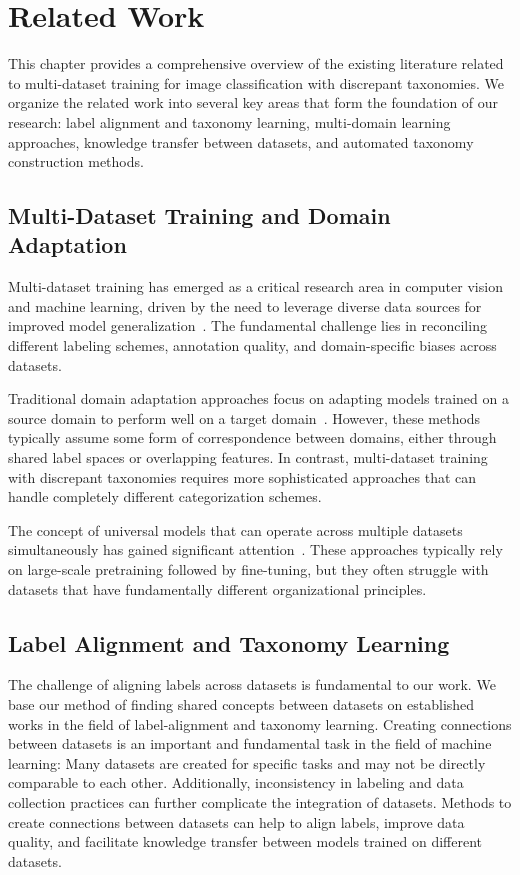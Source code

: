 \chapter{Related Work}

This chapter provides a comprehensive overview of the existing literature related to
multi-dataset training for image classification with discrepant taxonomies. We organize
the related work into several key areas that form the foundation of our research: label
alignment and taxonomy learning, multi-domain learning approaches, knowledge transfer
between datasets, and automated taxonomy construction methods.

\section{Multi-Dataset Training and Domain Adaptation}

Multi-dataset training has emerged as a critical research area in computer vision and
machine learning, driven by the need to leverage diverse data sources for improved model
generalization~\cite{zamir_taskonomy_2018}. The fundamental challenge lies in reconciling
different labeling schemes, annotation quality, and domain-specific biases across
datasets.

Traditional domain adaptation approaches focus on adapting models trained on a source
domain to perform well on a target domain~\cite{wang_deep_2018,ganin_domain-adversarial_2016}.
However, these methods typically assume some form of correspondence between domains,
either through shared label spaces or overlapping features. In contrast, multi-dataset
training with discrepant taxonomies requires more sophisticated approaches that can
handle completely different categorization schemes.

The concept of universal models that can operate across multiple datasets simultaneously
has gained significant attention~\cite{kolesnikov_big_2020,radford_learning_2021}.
These approaches typically rely on large-scale pretraining followed by fine-tuning,
but they often struggle with datasets that have fundamentally different organizational
principles.

\section{Label Alignment and Taxonomy Learning}

The challenge of aligning labels across datasets is fundamental to our work. We base our
method of finding shared concepts between datasets on established works in the field of
label-alignment and taxonomy learning. Creating connections between datasets is an
important and fundamental task in the field of machine learning: Many datasets are
created for specific tasks and may not be directly comparable to each other.
Additionally, inconsistency in labeling and data collection practices can further
complicate the integration of datasets. Methods to create connections between datasets
can help to align labels, improve data quality, and facilitate knowledge transfer
between models trained on different datasets.

